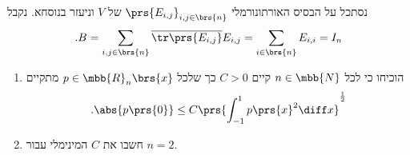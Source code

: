 \documentclass[a4paper,10pt,twoside,openany]{book}
\begin{document}
\begin{solution}
נסתכל על הבסיס האורתונורמלי
$\prs{E_{i,j}}_{i,j \in \brs{n}}$
של
$V$
וניעזר בנוסחא. נקבל
\[\text{.} B = \sum_{i,j \in \brs{n}} \overline{\tr\prs{E_{i,j}}} E_{i,j} = \sum_{i \in \brs{n}} E_{i,i} = I_n\]
\end{solution}

\begin{exercisechap}
\begin{enumerate}
\item הוכיחו כי לכל
$n \in \mbb{N}$
קיים
$C > 0$
כך שלכל
$p \in \mbb{R}_n\brs{x}$
מתקיים
\[\text{.} \abs{p\prs{0}} \leq C \prs{\int_{-1}^1 p\prs{x}^2 \diff x}^{\frac{1}{2}}\]

\item חשבו את
$C$
המינימלי עבור
$n=2$.
\end{enumerate}
\end{exercisechap}
\end{document}
